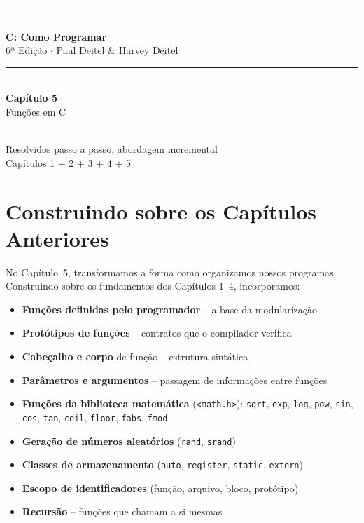 \documentclass[12pt,a4paper]{article}
\begin{document}
\begin{titlepage}
  \centering\vspace*{2cm}
  {\color{deitelblue}\rule{\linewidth}{2pt}}\\[0.4cm]
  {\huge\bfseries\color{deitelblue}C: Como Programar}\\[0.2cm]
  {\large\color{deitelblue}6ª Edição $\cdot$ Paul Deitel \& Harvey Deitel}\\[0.2cm]
  {\color{deitelblue}\rule{\linewidth}{2pt}}\\[1cm]
  {\LARGE\bfseries Capítulo 5}\\[0.3cm]
  {\Large\color{deitelblue!80}Funções em C}\\[0.8cm]
  \begin{tcolorbox}[colback=deitellightblue,colframe=deitelblue,width=0.85\linewidth]
    \\[0.2cm]
    {\normalsize Resolvidos passo a passo, abordagem incremental\\
    Capítulos 1 + 2 + 3 + 4 + 5}
  \end{tcolorbox}
\end{titlepage}

\section*{Construindo sobre os Capítulos Anteriores}

No Capítulo~5, transformamos a forma como organizamos nossos programas. Construindo sobre
os fundamentos dos Capítulos 1--4, incorporamos:

\begin{itemize}[noitemsep]
  \item \textbf{Funções definidas pelo programador} -- a base da modularização
  \item \textbf{Protótipos de funções} -- contratos que o compilador verifica
  \item \textbf{Cabeçalho e corpo} de função -- estrutura sintática
  \item \textbf{Parâmetros e argumentos} -- passagem de informações entre funções
  \item \textbf{Funções da biblioteca matemática} (\texttt{<math.h>}): \texttt{sqrt}, \texttt{exp}, \texttt{log}, \texttt{pow}, \texttt{sin}, \texttt{cos}, \texttt{tan}, \texttt{ceil}, \texttt{floor}, \texttt{fabs}, \texttt{fmod}
  \item \textbf{Geração de números aleatórios} (\texttt{rand}, \texttt{srand})
  \item \textbf{Classes de armazenamento} (\texttt{auto}, \texttt{register}, \texttt{static}, \texttt{extern})
  \item \textbf{Escopo de identificadores} (função, arquivo, bloco, protótipo)
  \item \textbf{Recursão} -- funções que chamam a si mesmas
\end{itemize}
\end{document}
